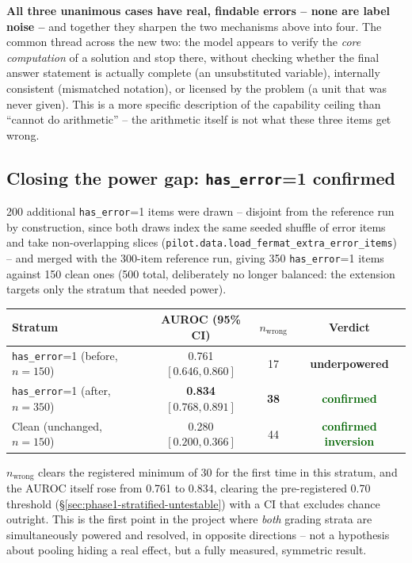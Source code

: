 \documentclass[11pt]{article}
\newcommand{\worked}[1]{\textcolor{darkgreen}{\textbf{#1}}}
\newcommand{\unresolved}[1]{\textcolor{darkamber}{\textbf{#1}}}
\begin{document}
\textbf{All three unanimous cases have real, findable errors -- none are
label noise --} and together they sharpen the two mechanisms above into
four. The common thread across the new two: the model appears to verify the
\emph{core computation} of a solution and stop there, without checking
whether the final answer statement is actually complete (an unsubstituted
variable), internally consistent (mismatched notation), or licensed by the
problem (a unit that was never given). This is a more specific description
of the capability ceiling than ``cannot do arithmetic'' -- the arithmetic
itself is not what these three items get wrong.

\subsection{Closing the power gap: \texttt{has\_error}=1 confirmed}
\label{sec:phase4-confirmed}

200 additional \texttt{has\_error}=1 items were drawn -- disjoint from the
reference run by construction, since both draws index the same seeded
shuffle of error items and take non-overlapping slices
(\texttt{pilot.data.load\_fermat\_extra\_error\_items}) -- and merged with
the 300-item reference run, giving 350 \texttt{has\_error}=1 items against
150 clean ones (500 total, deliberately no longer balanced: the extension
targets only the stratum that needed power).

\begin{center}
\begin{tabular}{lccc}
\toprule
Stratum & AUROC (95\% CI) & $n_{\text{wrong}}$ & Verdict \\
\midrule
\texttt{has\_error}=1 (before, $n=150$) & 0.761 $[0.646, 0.860]$ & 17 & \unresolved{underpowered} \\
\texttt{has\_error}=1 (after, $n=350$) & \textbf{0.834} $[0.768, 0.891]$ & \textbf{38} & \worked{confirmed} \\
Clean (unchanged, $n=150$) & 0.280 $[0.200, 0.366]$ & 44 & \worked{confirmed inversion} \\
\bottomrule
\end{tabular}
\end{center}

$n_{\text{wrong}}$ clears the registered minimum of 30 for the first time in
this stratum, and the AUROC itself rose from 0.761 to 0.834, clearing the
pre-registered 0.70 threshold (\S\ref{sec:phase1-stratified-untestable}) with
a CI that excludes chance outright. This is the first point in the project
where \emph{both} grading strata are simultaneously powered and resolved, in
opposite directions -- not a hypothesis about pooling hiding a real effect,
but a fully measured, symmetric result.
\end{document}
